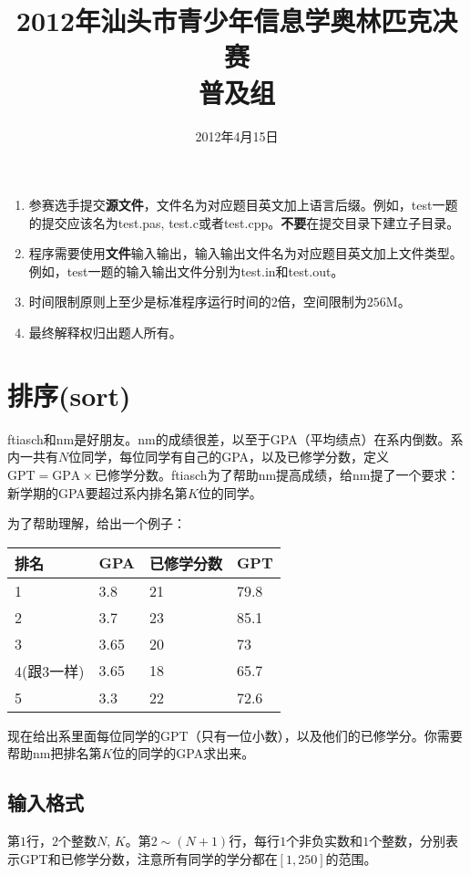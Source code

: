 \documentclass[a4paper]{article}
\title{2012年汕头市青少年信息学奥林匹克决赛\\
普及组}
\date{2012年4月15日}
\newcommand{\problem}{\section}
\newcommand{\inputformat}{\subsection{输入格式}}
\begin{document}
\maketitle

\begin{enumerate}
\item 参赛选手提交\textbf{源文件}，文件名为对应题目英文加上语言后缀。例如，test一题的提交应该名为test.pas, test.c或者test.cpp。\textbf{不要}在提交目录下建立子目录。

\item 程序需要使用\textbf{文件}输入输出，输入输出文件名为对应题目英文加上文件类型。例如，test一题的输入输出文件分别为test.in和test.out。

\item 时间限制原则上至少是标准程序运行时间的$2$倍，空间限制为$256$M。

\item 最终解释权归出题人所有。
\end{enumerate}

\problem{排序(sort)}

ftiasch和nm是好朋友。nm的成绩很差，以至于GPA（平均绩点）在系内倒数。系内一共有$N$位同学，每位同学有自己的GPA，以及已修学分数，定义$\textrm{GPT} = \textrm{GPA} \times \textrm{已修学分数}$。ftiasch为了帮助nm提高成绩，给nm提了一个要求：新学期的GPA要超过系内排名第$K$位的同学。

为了帮助理解，给出一个例子：

\begin{center}
\begin{tabular}{|l|l|l|l|}
\hline
排名 & GPA & 已修学分数 & GPT \\
\hline
1 & 3.8 & 21 & 79.8 \\
\hline
2 & 3.7 & 23 & 85.1 \\
\hline
3 & 3.65 & 20 & 73 \\
\hline
4(跟3一样) & 3.65 & 18 & 65.7 \\
\hline
5 & 3.3 & 22 & 72.6 \\
\hline
\end{tabular}
\end{center}

现在给出系里面每位同学的GPT（只有一位小数），以及他们的已修学分。你需要帮助nm把排名第$K$位的同学的GPA求出来。

\inputformat{}

第$1$行，$2$个整数$N$, $K$。第$2 \sim (N + 1)$行，每行$1$个非负实数和$1$个整数，分别表示GPT和已修学分数，注意所有同学的学分都在$[1, 250]$的范围。
\end{document}
